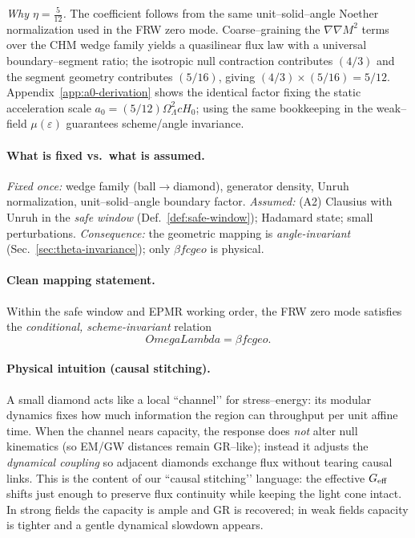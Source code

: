 \documentclass[aps,prd,onecolumn,superscriptaddress,nofootinbib]{revtex4-2}
\def\OmL{OmegaLambda}%
\def\cgeo{cgeo}%
\newcommand{\OmL}{\Omega_\Lambda}
\newcommand{\cgeo}{c_{\rm geo}}
\begin{document}
\noindent\emph{Why $\eta=\tfrac{5}{12}$.} 
The coefficient follows from the same unit–solid–angle Noether normalization used in the FRW zero mode. Coarse–graining the $\nabla\nabla M^2$ terms over the CHM wedge family yields a quasilinear flux law with a universal boundary–segment ratio; the isotropic null contraction contributes $(4/3)$ and the segment geometry contributes $(5/16)$, giving $(4/3)\!\times\!(5/16)=5/12$. Appendix~\ref{app:a0-derivation} shows the identical factor fixing the static acceleration scale $a_0=(5/12)\Omega_\Lambda^2 cH_0$; using the same bookkeeping in the weak–field $\mu(\varepsilon)$ guarantees scheme/angle invariance.

\paragraph{What is fixed vs.\ what is assumed.}
\emph{Fixed once:} wedge family (ball$\to$diamond), generator density, Unruh normalization, unit--solid--angle boundary factor. \emph{Assumed:} (A2) Clausius with Unruh in the \emph{safe window} (Def.\ \ref{def:safe-window}); Hadamard state; small perturbations. \emph{Consequence:} the geometric mapping is \emph{angle-invariant} (Sec.\ \ref{sec:theta-invariance}); only $\beta f \cgeo$ is physical.

\paragraph{Clean mapping statement.}
Within the safe window and EPMR working order, the FRW zero mode satisfies the \emph{conditional, scheme-invariant} relation
\begin{equation}
\label{eq:OmegaL-clean}
\OmL=\beta f \cgeo.
\end{equation}

\paragraph*{Physical intuition (causal stitching).}
A small diamond acts like a local “channel’’ for stress–energy: its modular dynamics fixes how much information the region can throughput per unit affine time. When the channel nears capacity, the response does \emph{not} alter null kinematics (so EM/GW distances remain GR–like); instead it adjusts the \emph{dynamical coupling} so adjacent diamonds exchange flux without tearing causal links. This is the content of our “causal stitching’’ language: the effective $G_{\rm eff}$ shifts just enough to preserve flux continuity while keeping the light cone intact. In strong fields the capacity is ample and GR is recovered; in weak fields capacity is tighter and a gentle dynamical slowdown appears.
\end{document}
